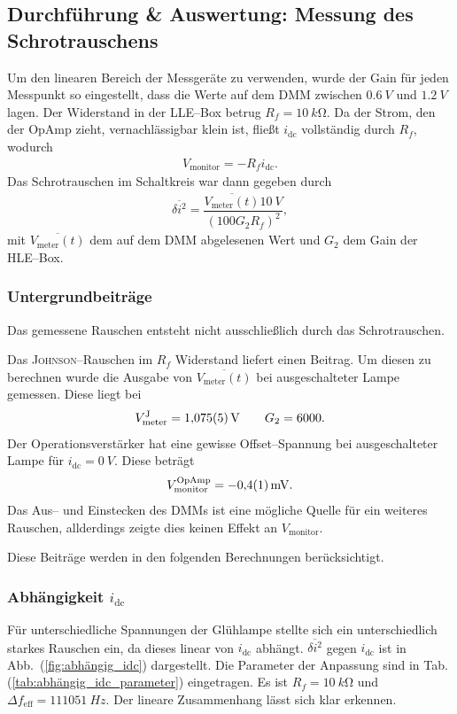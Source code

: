 \documentclass[sn-mathphys-num,iicol]{sn-jnl}
\theoremstyle{thmstyleone}
\theoremstyle{thmstyletwo}
\theoremstyle{thmstylethree}
\begin{document}
\subsection{Durchführung \& Auswertung: Messung des Schrotrauschens}
Um den linearen Bereich der Messgeräte zu verwenden, wurde der Gain für jeden Messpunkt so eingestellt, dass die Werte auf dem DMM zwischen $\SI{0.6}{V}$ und $\SI{1.2}{V}$ lagen.
Der Widerstand in der LLE--Box betrug $R_f=\SI{10}{k\ohm}$.
Da der Strom, den der OpAmp zieht, vernachlässigbar klein ist, fließt $i_\text{dc}$ vollständig durch $R_f$, wodurch
\begin{align}
	V_\text{monitor}=-R_fi_\text{dc}
	.\end{align}
Das Schrotrauschen im Schaltkreis war dann gegeben durch
\begin{align}
	\overline{\delta i^2}=\dfrac{\overline{V_\text{meter}(t)}\SI{10}{V}}{(100G_2R_f)^2}
	,\end{align}
mit $\overline{V_\text{meter}(t)}$ dem auf dem DMM abgelesenen Wert und $G_2$ dem Gain der HLE--Box.

\subsubsection{Untergrundbeiträge}
Das gemessene Rauschen entsteht nicht ausschließlich durch das Schrotrauschen.

Das \textsc{Johnson}--Rauschen im $R_f$ Widerstand liefert einen Beitrag.
Um diesen zu berechnen wurde die Ausgabe von $\overline{V_\text{meter}(t)}$ bei ausgeschalteter Lampe gemessen.
Diese liegt bei
\begin{align}
	V_\text{meter}^\text{J}=\SI{1.075+-0.005}{V}\qquad G_2=6000
	.\end{align}
Der Operationsverstärker hat eine gewisse Offset--Spannung bei ausgeschalteter Lampe für $i_\text{dc}=\SI{0}{V}$.
Diese beträgt
\begin{align}
	V_\text{monitor}^\text{OpAmp}=\SI{-0.4+-0.1}{mV}
	.\end{align}
Das Aus-- und Einstecken des DMMs ist eine mögliche Quelle für ein weiteres Rauschen, allderdings zeigte dies keinen Effekt an $V_\text{monitor}$.

Diese Beiträge werden in den folgenden Berechnungen berücksichtigt.

\subsubsection{Abhängigkeit $i_\text{dc}$}
Für unterschiedliche Spannungen der Glühlampe stellte sich ein unterschiedlich starkes Rauschen ein, da dieses linear von $i_\text{dc}$ abhängt.
$\overline{\delta i^2}$ gegen $i_\text{dc}$ ist in Abb.\ (\ref{fig:abhängig_idc}) dargestellt.
Die Parameter der Anpassung sind in Tab. (\ref{tab:abhängig_idc_parameter}) eingetragen.
Es ist $R_f=\SI{10}{k\ohm}$ und $\Delta f_\text{eff}=\SI{111051}{Hz}$.
Der lineare Zusammenhang lässt sich klar erkennen. %
\end{document}
